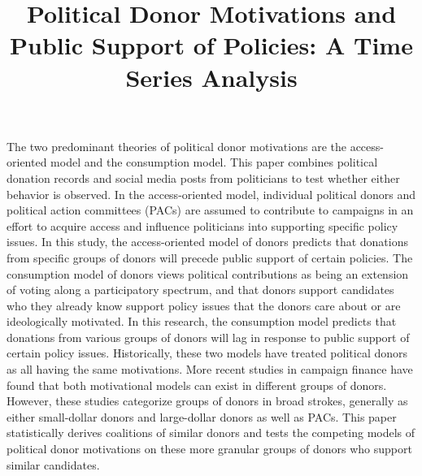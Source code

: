 \documentclass[12pt,]{article}
\title{Political Donor Motivations and Public Support of Policies: A Time
Series Analysis  }
\author{\Large \vspace{0.05in} \newline\normalsize\emph{}  }
\date{}
\newcommand*{\authorfont}{\fontfamily{phv}\selectfont}
\renewenvironment{abstract}
 {{%
    \setlength{\leftmargin}{0mm}
    \setlength{\rightmargin}{\leftmargin}%
  }%
  \relax}
 {\endlist}
\begin{document}
	
%

{%
\setlength{\parindent}{0pt}
\thispagestyle{plain}
{\fontsize{18}{20}\selectfont\raggedright 
\maketitle  %

}

{
   \vskip 13.5pt\relax \normalsize\fontsize{11}{12} 
\textbf{\authorfont } \hskip 15pt \emph{\small }   

}

}








\begin{abstract}

    \hbox{\vrule height .2pt width 39.14pc}

    \vskip 8.5pt %

\noindent The two predominant theories of political donor motivations are the
access-oriented model and the consumption model. This paper combines
political donation records and social media posts from politicians to
test whether either behavior is observed. In the access-oriented model,
individual political donors and political action committees (PACs) are
assumed to contribute to campaigns in an effort to acquire access and
influence politicians into supporting specific policy issues. In this
study, the access-oriented model of donors predicts that donations from
specific groups of donors will precede public support of certain
policies. The consumption model of donors views political contributions
as being an extension of voting along a participatory spectrum, and that
donors support candidates who they already know support policy issues
that the donors care about or are ideologically motivated. In this
research, the consumption model predicts that donations from various
groups of donors will lag in response to public support of certain
policy issues. Historically, these two models have treated political
donors as all having the same motivations. More recent studies in
campaign finance have found that both motivational models can exist in
different groups of donors. However, these studies categorize groups of
donors in broad strokes, generally as either small-dollar donors and
large-dollar donors as well as PACs. This paper statistically derives
coalitions of similar donors and tests the competing models of political
donor motivations on these more granular groups of donors who support
similar candidates.


    \hbox{\vrule height .2pt width 39.14pc}


\end{abstract}
\end{document}
